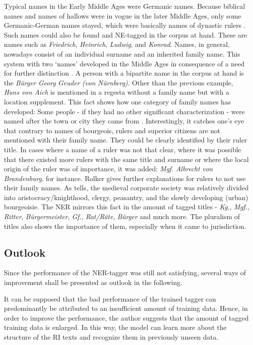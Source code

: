 \documentclass[11pt,a4paper]{article}
\begin{document}
Typical names in the Early Middle Ages were Germanic names. Because biblical names and names of hallows were in vogue in the later Middle Ages, only some Germanic-German names stayed, which were basically names of dynastic rulers \cite{debus2012namenkunde}. Such names could also be found and NE-tagged in the corpus at hand. These are names such as \textit{Friedrich}, \textit{Heinrich}, \textit{Ludwig}, and \textit{Konrad}. Names, in general, nowadays consist of an individual surname and an inherited family name. This system with two ‘names’ developed in the Middle Ages in consequence of a need for further distinction \cite{debus2012namenkunde}. A person with a bipartite name in the corpus at hand is the \textit{B{\"u}rger Georg Geuder (von N{\"u}rnberg)}. Other than the previous example, \textit{Hans von Aich} is mentioned in a regesta without a family name but with a location supplement. This fact shows how one category of family names has developed: Some people - if they had no other significant characterization - were named after the town or city they came from \cite{debus2012namenkunde}. Interestingly, it catches one’s eye that contrary to names of bourgeois, rulers and superior citizens are not mentioned with their family name. They could be clearly identified by their ruler title. In cases where a name of a ruler was not that clear, where it was possible that there existed more rulers with the same title and surname or where the local origin of the ruler was of importance, it was added: \textit{Mgf. Albrecht von Brandenburg}, for instance. Rolker \cite{rolker_spiel_2014} gives further explanations for rulers to not use their family names. As \cite{debus2012namenkunde} tells, the medieval corporate society was relatively divided into aristocracy/knighthood, clergy, peasantry, and the slowly developing (urban) bourgeoisie. The NER mirrors this fact in the amount of tagged titles - \textit{Kg.}, \textit{Mgf.}, \textit{Ritter}, \textit{B{\"u}rgermeister}, \textit{Gf.}, \textit{Rat/R{\"a}te}, \textit{B{\"u}rger} and much more. The pluralism of titles also shows the importance of them, especially when it came to jurisdiction.

\subsection{Outlook}
Since the performance of the NER-tagger was still not satisfying, several ways of improvement shall be presented as outlook in the following. 

It can be supposed that the bad performance of the trained tagger can predominantly be attributed to an insufficient amount of training data. Hence, in order to improve the performance, the author suggests that the amount of tagged training data is enlarged. In this way, the model can learn more about the structure of the RI texts and recognize them in previously unseen data.
\end{document}
